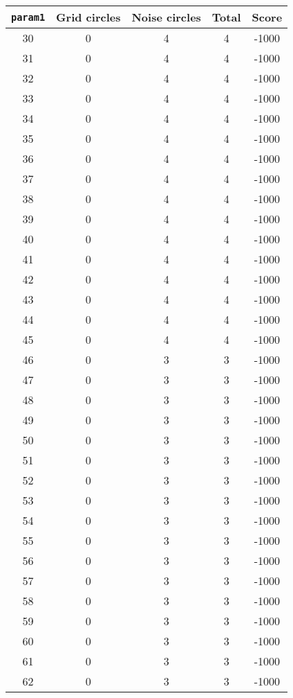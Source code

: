 \documentclass[letterpaper, 12pt]{article}
\begin{document}
\begin{longtable}{|c|c|c|c|c|}
\hline
\textbf{\texttt{param1}} & \textbf{Grid circles} & \textbf{Noise circles} & \textbf{Total} & \textbf{Score} \\
\hline
30 & 0 & 4 & 4 & -1000 \\
\hline
31 & 0 & 4 & 4 & -1000 \\
\hline
32 & 0 & 4 & 4 & -1000 \\
\hline
33 & 0 & 4 & 4 & -1000 \\
\hline
34 & 0 & 4 & 4 & -1000 \\
\hline
35 & 0 & 4 & 4 & -1000 \\
\hline
36 & 0 & 4 & 4 & -1000 \\
\hline
37 & 0 & 4 & 4 & -1000 \\
\hline
38 & 0 & 4 & 4 & -1000 \\
\hline
39 & 0 & 4 & 4 & -1000 \\
\hline
40 & 0 & 4 & 4 & -1000 \\
\hline
41 & 0 & 4 & 4 & -1000 \\
\hline
42 & 0 & 4 & 4 & -1000 \\
\hline
43 & 0 & 4 & 4 & -1000 \\
\hline
44 & 0 & 4 & 4 & -1000 \\
\hline
45 & 0 & 4 & 4 & -1000 \\
\hline
46 & 0 & 3 & 3 & -1000 \\
\hline
47 & 0 & 3 & 3 & -1000 \\
\hline
48 & 0 & 3 & 3 & -1000 \\
\hline
49 & 0 & 3 & 3 & -1000 \\
\hline
50 & 0 & 3 & 3 & -1000 \\
\hline
51 & 0 & 3 & 3 & -1000 \\
\hline
52 & 0 & 3 & 3 & -1000 \\
\hline
53 & 0 & 3 & 3 & -1000 \\
\hline
54 & 0 & 3 & 3 & -1000 \\
\hline
55 & 0 & 3 & 3 & -1000 \\
\hline
56 & 0 & 3 & 3 & -1000 \\
\hline
57 & 0 & 3 & 3 & -1000 \\
\hline
58 & 0 & 3 & 3 & -1000 \\
\hline
59 & 0 & 3 & 3 & -1000 \\
\hline
60 & 0 & 3 & 3 & -1000 \\
\hline
61 & 0 & 3 & 3 & -1000 \\
\hline
62 & 0 & 3 & 3 & -1000 \\

\end{longtable}
\end{document}
